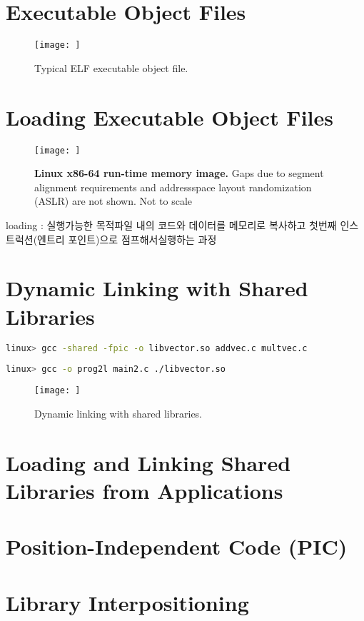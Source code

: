\section{Executable Object Files}


\begin{figure}[h!]
    \centering
    \texttt{[image: ]}
    \caption{Typical ELF executable object file.}
\end{figure}

\section{Loading Executable Object Files}

\begin{figure}[h!]
    \centering
    \texttt{[image: ]}
    \caption{\textbf{Linux x86-64 run-time memory image.} 
    Gaps due to segment alignment requirements and addressspace layout randomization (ASLR) are not shown. Not to scale}
\end{figure}

loading : 실행가능한 목적파일 내의 코드와 데이터를 메모리로 복사하고 첫번째 인스트럭션(엔트리 포인트)으로 점프해서실행하는 과정

\section{Dynamic Linking with Shared Libraries}

\begin{lstlisting}[language=bash]
linux> gcc -shared -fpic -o libvector.so addvec.c multvec.c
\end{lstlisting}

\begin{lstlisting}[language=bash]
    linux> gcc -o prog2l main2.c ./libvector.so
\end{lstlisting}

\begin{figure}[h!]
    \centering
    \texttt{[image: ]}
    \caption{Dynamic linking with shared libraries.}
\end{figure}



\section{Loading and Linking Shared Libraries from Applications}

\section{Position-Independent Code (PIC)}

\section{Library Interpositioning}
